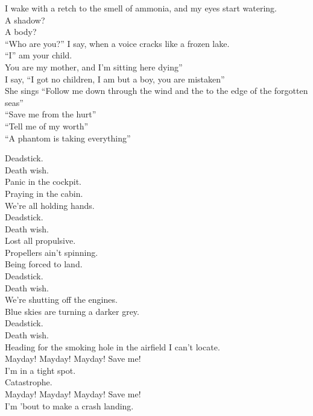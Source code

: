I wake with a retch to the smell of ammonia, and my eyes start watering. \\
A shadow? \\
A body? \\
``Who are you?'' I say, when a voice cracks like a frozen lake. \\
``I'' am your child. \\
You are my mother, and I'm sitting here dying'' \\
I say, ``I got no children, I am but a boy, you are mistaken'' \\

She sings ``Follow me down through the wind and the  to the edge of the forgotten seas'' \\
``Save me from the hurt'' \\
``Tell me of my worth'' \\
``A phantom is taking everything'' \\


Deadstick. \\
Death wish. \\
Panic in the cockpit. \\
Praying in the cabin. \\
We're all holding hands. \\
Deadstick. \\
Death wish. \\
Lost all propulsive. \\
Propellers ain't spinning. \\
Being forced to land. \\
Deadstick. \\
Death wish. \\
We're shutting off the engines. \\
Blue skies are turning a darker grey. \\
Deadstick. \\
Death wish. \\
Heading for the smoking hole in the airfield I can't locate. \\

Mayday! Mayday! Mayday! Save me! \\
I'm in a tight spot. \\
Catastrophe. \\
Mayday! Mayday! Mayday! Save me! \\
I'm 'bout to make a crash landing. \\


